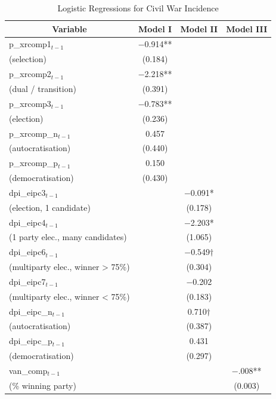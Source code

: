 
\def\onepc{$^{\ast\ast}$} \def\fivepc{$^{\ast}$}
\def\tenpc{$^{\dag}$}
\def\legend{\multicolumn{4}{l}{\footnotesize{Significance levels
:\hspace{1em} $\dag$ : .1 \hspace{1em}
$\ast$ : .05 \hspace{1em} $\ast\ast$ : .01 \normalsize}}}

\begin{table}[htbp]\centering \footnotesize \caption{Logistic Regressions for Civil War Incidence \label{table1:sumstats}}
\begin{tabular}{l c c c}\hline\hline
\multicolumn{1}{c}{\textbf{Variable}} & \textbf{Model I}
 & \textbf{Model II}& \textbf{Model III}\\ \hline
p\_xrcomp1$_{t-1}$ & $-$0.914**\\
(selection) & (0.184)\\
p\_xrcomp2$_{t-1}$ & $-$2.218**\\
(dual / transition) & (0.391)\\
p\_xrcomp3$_{t-1}$ & $-$0.783**\\
(election) & (0.236)\\
p\_xrcomp\_n$_{t-1}$ & 0.457\\
(autocratisation) & (0.440)\\
p\_xrcomp\_p$_{t-1}$ & 0.150\\
(democratisation) & (0.430)\\
dpi\_eipc3$_{t-1}$ & & $-$0.091*\\
(election, 1 candidate) & & (0.178)\\
dpi\_eipc4$_{t-1}$ & & $-$2.203*\\
(1 party elec., many candidates) & & (1.065)\\
dpi\_eipc6$_{t-1}$  & & $-$0.549$\dagger$\\
(multiparty elec., winner > 75\%) & & (0.304)\\
dpi\_eipc7$_{t-1}$ & & $-$0.202\\
(multiparty elec., winner < 75\%) & & (0.183)\\
dpi\_eipc\_n$_{t-1}$ & & 0.710$\dagger$\\
(autocratisation) & & (0.387)\\
dpi\_eipc\_p$_{t-1}$ & & 0.431\\
(democratisation) & & (0.297)\\
van\_comp$_{t-1}$ & & & $-$.008**\\
(\% winning party) & & & (0.003)\\

\end{tabular}
\end{table}
